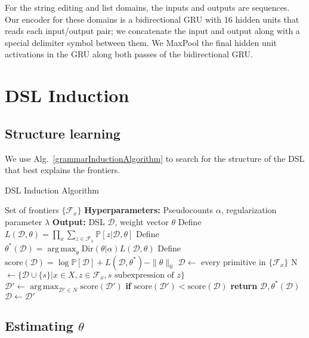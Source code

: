 \documentclass{article}
\DeclareMathOperator*{\argmax}{arg\,max} %
\newcommand{\probability}{\mathds{P}} %
\begin{document}
For the string editing and list domains,
the inputs and outputs are sequences. Our encoder for these domains is a bidirectional GRU with 16 hidden units that reads each input/output pair; we concatenate the input and output along with a special delimiter
symbol between them.
We MaxPool the final hidden unit activations in the GRU along both passes of the bidirectional GRU.

\section{DSL Induction}

\subsection{Structure learning}

We use Alg.~\ref{grammarInductionAlgorithm} to search for the structure of the DSL that best explains the frontiers.

\setcounter{algorithm}{2} %
\begin{algorithm}[tb]
   \caption{DSL Induction Algorithm}
   \label{grammarInductionAlgorithm}
   \begin{algorithmic}
      Set of frontiers $\{\mathcal{F}_x\}$
     \STATE \textbf{Hyperparameters:} Pseudocounts $\alpha$, regularization parameter $\lambda$
     \STATE \textbf{Output:} DSL $\mathcal{D}$, weight vector $\theta$
     \STATE Define $L(\mathcal{D},\theta) =  \prod_x \sum_{z\in \mathcal{F}_x} \probability[z|\mathcal{D},\theta]$
     \STATE Define $\theta^*(\mathcal{D}) = \argmax_\theta \text{Dir}(\theta|\alpha) L(\mathcal{D},\theta)$
     \STATE Define $\text{score}(\mathcal{D}) = \log \probability[\mathcal{D}] + L(\mathcal{D},\theta^*) - \|\theta\|_0$
     \STATE $\mathcal{D}\gets$ every primitive in $\{\mathcal{F}_x\}$
     \STATE N $\gets \{\mathcal{D}\cup \{s\} | x\in X, z\in \mathcal{F}_x, s\text{ subexpression of }z\}$
     \STATE $\mathcal{D}'\gets \argmax_{\mathcal{D}'\in N}\text{score}(\mathcal{D}') $
     \STATE \textbf{if }$\text{score}(\mathcal{D}') < \text{score}(\mathcal{D})$\textbf{ return }$\mathcal{D},\theta^*(\mathcal{D})$
     \STATE $\mathcal{D}\gets\mathcal{D}'$
     \ENDWHILE
   \end{algorithmic}
\end{algorithm}

\subsection{Estimating $\theta$}
\end{document}
